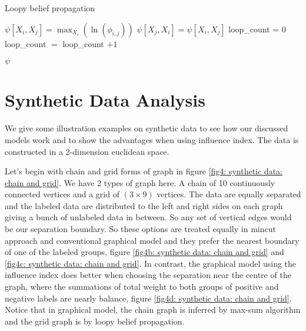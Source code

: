 \begin{algorithm}[H]
	\caption{Loopy belief propagation}
	\begin{algorithmic}[1]
		\State $\psi[X_i, X_j] = \max_{X_i}{\left( \ln{(\phi_{i,j})} \right)}$
		\State $\psi[X_j, X_i] = \psi[X_i, X_j]$
		\EndFor
		\State loop\_count = 0
			\EndFor
		\State loop\_count $=$ loop\_count $+ 1$
		\EndWhile
		
		\RETURN $\psi$
		
		\EndFunction
	\end{algorithmic}
	\label{alg4: loopy belief}
\end{algorithm}

\section{Synthetic Data Analysis}

We give some illustration examples on synthetic data to see how our discussed models work and to show the advantages when using influence index. The data is constructed in a 2-dimension euclidean space.

Let's begin with chain and grid forms of graph in figure \ref{fig4: synthetic data: chain and grid}. We have 2 types of graph here. A chain of 10 continuously connected vertices and a grid of $(3\times 9)$ vertices. The data are equally separated and the labeled data are distributed to the left and right sides on each graph giving a bunch of unlabeled data in between. So any set of vertical edges would be our separation boundary. So these options are treated equally in mincut approach and conventional graphical model and they prefer the nearest boundary of one of the labeled groups, figure \ref{fig4b: synthetic data: chain and grid} and \ref{fig4c: synthetic data: chain and grid}. In contrast, the graphical model using the influence index does better when choosing the separation near the centre of the graph, where the summations of total weight to both groups of positive and negative labels are nearly balance, figure \ref{fig4d: synthetic data: chain and grid}. Notice that in graphical model, the chain graph is inferred by max-sum algorithm and the grid graph is by loopy belief propagation.

